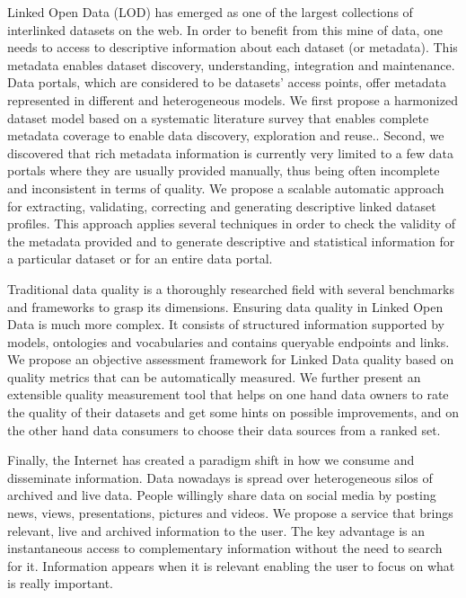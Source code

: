 Linked Open Data (LOD) has emerged as one of the largest collections of interlinked datasets on the web. In order to benefit from this mine of data, one needs to access to descriptive information about each dataset (or metadata). This metadata enables dataset discovery, understanding, integration and maintenance. Data portals, which are considered to be datasets' access points, offer metadata represented in different and heterogeneous models. We first propose a harmonized dataset model based on a systematic literature survey that enables complete metadata coverage to enable data discovery, exploration and reuse.. Second, we discovered that rich metadata information is currently very limited to a few data portals where they are usually provided manually, thus being often incomplete and inconsistent in terms of quality. We propose a scalable automatic approach for extracting, validating, correcting and generating descriptive linked dataset profiles. This approach applies several techniques in order to check the validity of the metadata provided and to generate descriptive and statistical information for a particular dataset or for an entire data portal.

Traditional data quality is a thoroughly researched field with several benchmarks and frameworks to grasp its dimensions. Ensuring data quality in Linked Open Data is much more complex. It consists of structured information supported by models, ontologies and vocabularies and contains queryable endpoints and links. We propose an objective assessment framework for Linked Data quality based on quality metrics that can be automatically measured. We further present an extensible quality measurement tool that helps on one hand data owners to rate the quality of their datasets and get some hints on possible improvements, and on the other hand data consumers to choose their data sources from a ranked set.

Finally, the Internet has created a paradigm shift in how we consume and disseminate information. Data nowadays is spread over heterogeneous silos of archived and live data. People willingly share data on social media by posting news, views, presentations, pictures and videos. We propose a service that brings relevant, live and archived information to the user. The key advantage is an instantaneous access to complementary information without the need to search for it. Information appears when it is relevant enabling the user to focus on what is really important.